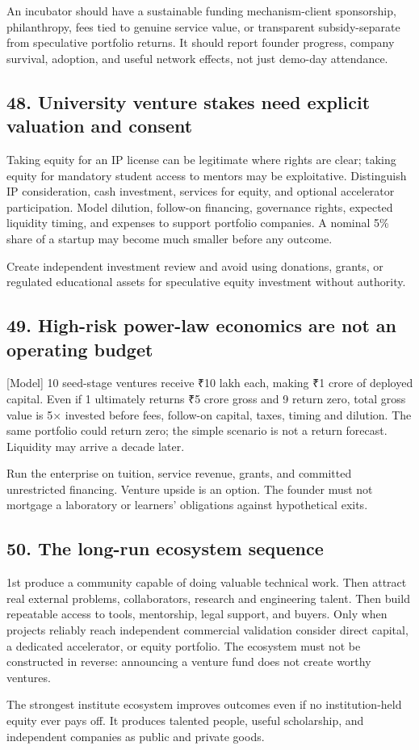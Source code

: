 An incubator should have a sustainable funding mechanism-client sponsorship, philanthropy, fees tied to genuine service value, or transparent subsidy-separate from speculative portfolio returns. It should report founder progress, company survival, adoption, and useful network effects, not just demo-day attendance.

\subsection{48. University venture stakes need explicit valuation and consent}

Taking equity for an IP license can be legitimate where rights are clear; taking equity for mandatory student access to mentors may be exploitative. Distinguish IP consideration, cash investment, services for equity, and optional accelerator participation. Model dilution, follow-on financing, governance rights, expected liquidity timing, and expenses to support portfolio companies. A nominal 5\% share of a startup may become much smaller before any outcome.

Create independent investment review and avoid using donations, grants, or regulated educational assets for speculative equity investment without authority.

\subsection{49. High-risk power-law economics are not an operating budget}

[Model] 10 seed-stage ventures receive ₹10 lakh each, making ₹1 crore of deployed capital. Even if 1 ultimately returns ₹5 crore gross and 9 return zero, total gross value is 5× invested before fees, follow-on capital, taxes, timing and dilution. The same portfolio could return zero; the simple scenario is not a return forecast. Liquidity may arrive a decade later.

Run the enterprise on tuition, service revenue, grants, and committed unrestricted financing. Venture upside is an option. The founder must not mortgage a laboratory or learners' obligations against hypothetical exits.

\subsection{50. The long-run ecosystem sequence}

1st produce a community capable of doing valuable technical work. Then attract real external problems, collaborators, research and engineering talent. Then build repeatable access to tools, mentorship, legal support, and buyers. Only when projects reliably reach independent commercial validation consider direct capital, a dedicated accelerator, or equity portfolio. The ecosystem must not be constructed in reverse: announcing a venture fund does not create worthy ventures.

The strongest institute ecosystem improves outcomes even if no institution-held equity ever pays off. It produces talented people, useful scholarship, and independent companies as public and private goods.
